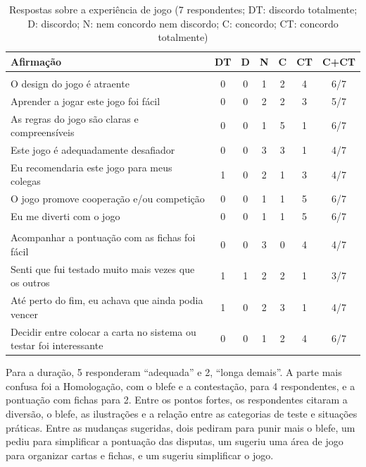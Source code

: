 \begin{table}[ht]
  \centering
  \caption{Respostas sobre a experiência de jogo (7 respondentes; DT: discordo totalmente; D: discordo; N: nem
    concordo nem discordo; C: concordo; CT: concordo totalmente)}
  \label{tab:playtest}
  \scriptsize
  \begin{tabularx}{\linewidth}{>{\raggedright\arraybackslash}X c c c c c c}
    \toprule
    Afirmação & DT & D & N & C & CT & C+CT \\
    \midrule
    \multicolumn{7}{l}{\textit{Sobre o jogo}} \\
    O design do jogo é atraente & 0 & 0 & 1 & 2 & 4 & 6/7 \\
    Aprender a jogar este jogo foi fácil & 0 & 0 & 2 & 2 & 3 & 5/7 \\
    As regras do jogo são claras e compreensíveis & 0 & 0 & 1 & 5 & 1 & 6/7 \\
    Este jogo é adequadamente desafiador & 0 & 0 & 3 & 3 & 1 & 4/7 \\
    Eu recomendaria este jogo para meus colegas & 1 & 0 & 2 & 1 & 3 & 4/7 \\
    O jogo promove cooperação e/ou competição & 0 & 0 & 1 & 1 & 5 & 6/7 \\
    Eu me diverti com o jogo & 0 & 0 & 1 & 1 & 5 & 6/7 \\
    \midrule
    \multicolumn{7}{l}{\textit{Sobre as regras}} \\
    Acompanhar a pontuação com as fichas foi fácil & 0 & 0 & 3 & 0 & 4 & 4/7 \\
    Senti que fui testado muito mais vezes que os outros & 1 & 1 & 2 & 2 & 1 & 3/7 \\
    Até perto do fim, eu achava que ainda podia vencer & 1 & 0 & 2 & 3 & 1 & 4/7 \\
    Decidir entre colocar a carta no sistema ou testar foi interessante & 0 & 0 & 1 & 2 & 4 & 6/7 \\
    \bottomrule
  \end{tabularx}
\end{table}

Para a duração, 5 responderam ``adequada'' e 2, ``longa
demais''. A parte mais confusa foi a Homologação, com o blefe e a contestação, para 4 respondentes, e a pontuação
com fichas para 2. Entre os pontos fortes, os respondentes citaram a diversão, o blefe, as ilustrações e a relação
entre as categorias de teste e situações práticas. Entre as mudanças sugeridas, dois pediram para punir mais o
blefe, um pediu para simplificar a pontuação das disputas, um sugeriu uma área de jogo para organizar cartas e
fichas, e um sugeriu simplificar o jogo.

